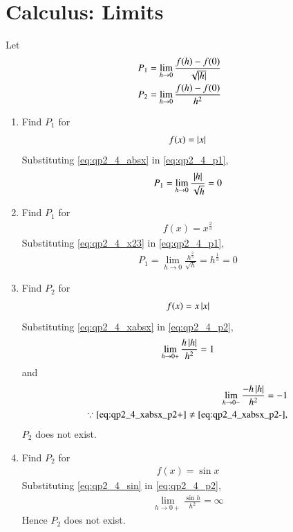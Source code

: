\documentclass[journal,12pt,twocolumn]{IEEEtran}
\renewcommand\thesection{\arabic{section}}
\begin{document}
\section{Calculus: Limits}
Let
\begin{align}
\label{eq:qp2_4_p1}
P_1 = \lim_{h \to 0} \frac{f(h)-f(0)}{\sqrt{\left\vert h\right\vert}}
\\
P_2 = \lim_{h \to 0} \frac{f(h)-f(0)}{h^2}
\label{eq:qp2_4_p2}
\end{align}
%
\begin{enumerate}[label=\thesection.\arabic*
,ref=\thesection.\theenumi]
\item Find $P_1$ for 
\begin{align}
\label{eq:qp2_4_absx}
f(x) =\left\vert x\right\vert
\end{align}
\solution Substituting \eqref{eq:qp2_4_absx} in \eqref{eq:qp2_4_p1},
\begin{align}
\label{eq:qp2_4_absx_p1}
P_1 =\lim_{h\to 0}\frac{\left\vert h\right\vert}{\sqrt{h}} = 0
\end{align}
\item Find $P_1$ for 
\begin{align}
\label{eq:qp2_4_x23}
f(x) =x^{\frac{2}{3}}
\end{align}
\solution Substituting \eqref{eq:qp2_4_x23} in \eqref{eq:qp2_4_p1},
\begin{align}
\label{eq:qp2_4_x23_p1}
P_1 =\lim_{h\to 0}\frac{h^{\frac{2}{3}}}{\sqrt{h}} = h^{\frac{1}{3}}=0
\end{align}
\item Find $P_2$ for 
\begin{align}
\label{eq:qp2_4_xabsx}
f(x) =x\left\vert x\right\vert
\end{align}
\solution Substituting \eqref{eq:qp2_4_xabsx} in \eqref{eq:qp2_4_p2},
\begin{align}
\label{eq:qp2_4_xabsx_p2+}
\lim_{h\to 0+}\frac{h\left\vert h\right\vert}{h^2} = 1 
\end{align}
and
\begin{align}
\label{eq:qp2_4_xabsx_p2-}
\lim_{h\to 0-}\frac{-h\left\vert h\right\vert}{h^2} = -1
\\
\because \eqref{eq:qp2_4_xabsx_p2+}\ne \eqref{eq:qp2_4_xabsx_p2-},
\end{align}
$P_2$ does not exist.
\item Find $P_2$ for 
\begin{align}
\label{eq:qp2_4_sin}
f(x) =\sin x
\end{align}
\solution Substituting \eqref{eq:qp2_4_sin} in \eqref{eq:qp2_4_p2},
\begin{align}
\label{eq:qp2_4_sin}
\lim_{h\to 0+}\frac{\sin h}{h^2} = \infty
\end{align}
%
Hence $P_2$ does not exist.
\end{enumerate}
\end{document}
